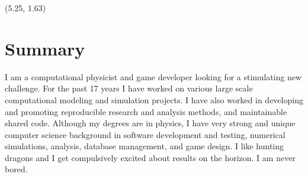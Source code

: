 \documentclass[11pt]{seilercv}
\begin{document}
%
%

\begin{textblock}{9.6}(5.25, 1.63)
\section{Summary}
I am a computational physicist and game developer looking for a stimulating new challenge. For the past 17 years I have worked on various large scale computational modeling and simulation projects. I have also worked in developing and promoting reproducible research and analysis methods, and maintainable shared code. Although my degrees are in physics, I have very strong and unique computer science background in software development and testing, numerical simulations, analysis, database management, and game design.
I like hunting dragons and I get compulsively excited about results on the horizon. I am never bored. 


\end{textblock}
\end{document}
